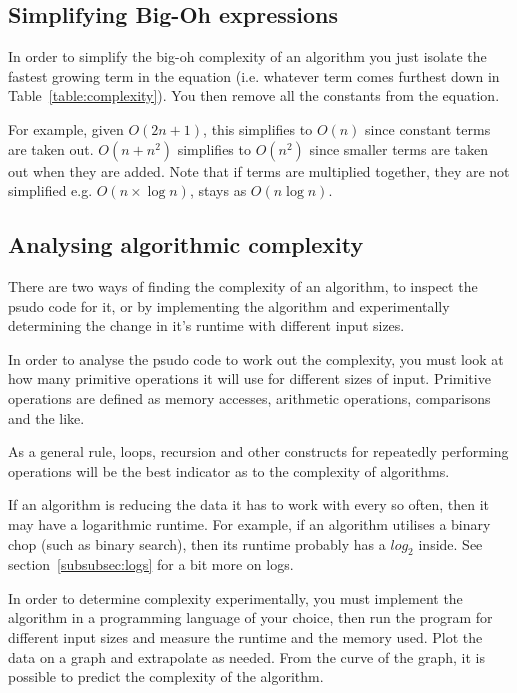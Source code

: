 \subsection{Simplifying Big-Oh expressions}

In order to simplify the big-oh complexity of an algorithm you just isolate the
fastest growing term in the equation (i.e. whatever term comes furthest down in
Table~\ref{table:complexity}). You then remove all the constants from the
equation.

For example, given $O(2n + 1)$, this simplifies to $O(n)$ since constant terms
are taken out. $O(n + n^2)$ simplifies to $O(n^2)$ since smaller terms are taken
out when they are added. Note that if terms are multiplied together, they are not
simplified e.g. $O(n \times \log n)$, stays as $O(n\log n)$.

\subsection{Analysing algorithmic complexity}

There are two ways of finding the complexity of an algorithm, to inspect the
psudo code for it, or by implementing the algorithm and experimentally
determining the change in it's runtime with different input sizes.


In order to analyse the psudo code to work out the complexity, you must look at
how many primitive operations it will use for different sizes of input.
Primitive operations are defined as memory accesses, arithmetic operations,
comparisons and the like.

As a general rule, loops, recursion and other constructs for repeatedly
performing operations will be the best indicator as to the complexity of
algorithms.

If an algorithm is reducing the data it has to work with every so often, then it
may have a logarithmic runtime. For example, if an algorithm utilises a binary
chop (such as binary search), then its runtime probably has a $log_2$ inside.
See section~\ref{subsubsec:logs} for a bit more on logs.

In order to determine complexity experimentally, you must implement the
algorithm in a programming language of your choice, then run the program for
different input sizes and measure the runtime and the memory used. Plot the data
on a graph and extrapolate as needed. From the curve of the graph, it is
possible to predict the complexity of the algorithm.

